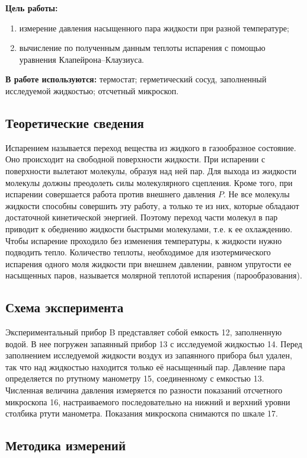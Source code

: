 \documentclass[12pt,a4paper]{article}
\begin{document}
\textbf{Цель работы:}  \begin{enumerate}
	\item измерение давления насыщенного пара жидкости при разной температуре;
	\item вычисление по полученным данным теплоты испарения с помощью уравнения Клапейрона–Клаузиуса.
\end{enumerate}

\textbf{В работе используются:} термостат; герметический сосуд, заполненный исследуемой жидкостью; отсчетный микроскоп.

\subsection{Теоретические сведения}

Испарением называется переход вещества из жидкого в газообразное состояние. Оно происходит на свободной поверхности жидкости. При испарении с поверхности вылетают молекулы, образуя над ней пар. Для выхода из жидкости молекулы должны преодолеть силы молекулярного сцепления. Кроме того, при испарении совершается работа против внешнего давления $ P $. Не все молекулы жидкости способны совершить эту работу, а только те из них, которые обладают достаточной кинетической энергией. Поэтому переход части молекул в пар приводит к обеднению жидкости быстрыми молекулами, т.е. к ее охлаждению. Чтобы испарение проходило без изменения температуры, к жидкости нужно подводить тепло. Количество теплоты, необходимое для изотермического испарения одного моля жидкости при внешнем давлении, равном упругости ее насыщенных паров, называется молярной теплотой испарения (парообразования).

\subsection{Схема эксперимента}

Экспериментальный прибор B представляет собой емкость 12, заполненную водой. В нее погружен запаянный прибор 13 с исследуемой жидкостью 14. Перед заполнением исследуемой жидкости воздух из запаянного прибора был удален, так что над жидкостью находится только её насыщенный пар. Давление пара определяется по ртутному манометру 15, соединенному с емкостью 13. Численная величина давления измеряется по разности показаний отсчетного микроскопа 16, настраиваемого последовательно на нижний и верхний уровни столбика ртути манометра. Показания микроскопа снимаются по шкале 17.

\subsection{Методика измерений}
\end{document}

